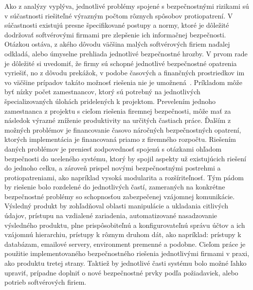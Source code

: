 Ako z analýzy vyplýva, jednotlivé problémy spojené s bezpečnostnými rizikami sú v súčastnosti riešiteľné výrazným počtom
rôznych spôsobov protiopatrení.
V súčastnosti existujú presne špecifikované postupy a normy, ktoré je dôležité dodržovať softvérovými firmami pre zlepšenie
ich informačnej bezpečnosti.
Otázkou ostáva, z akého dôvodu väčšina malých softvérových firiem naďalej odkladá, alebo úmyselne prehliada jednotlivé bezpečnostné hrozby.
V prvom rade je dôležité si uvedomiť, že firmy sú schopné jednotlivé bezpečnostné opatrenia vyriešiť, no z dôvodu
prekážok, v podobe časových a finančných prostriedkov im vo väčšine prípadov takáto možnosť riešenia nie je umožnená~\cite{CompanySecurity}.
Príkladom môže byť nízky počet zamestnancov, ktorý sú potrebný na jednotlivých špecializovaných úlohách pridelených k projektom.
Prevelením jednoho zamestnanca z projektu s cieľom riešenia firemnej bezpečnosti, môže mať za následok výrazné zníženie
produktivity na určitých častiach práce.
Ďalším z možných problémov je financovanie časovo náročných bezpečnostných opatrení, ktorých implementácia je financovaná
priamo z firemného rozpočtu.
Riešením daných problémov je preniesť zodpovednosť spojenú s otázkami ohľadom bezpečnosti do uceleného systému, ktorý by
spojil aspekty už existujúcich riešení do jednoho celku, a zároveň prispel novými bezpečnostnými postrehmi a protiopatreniami,
ako napríklad vysoká modularita a rozšíriteľnosť.
Tým pádom by riešenie bolo rozdelené do jednotlivých častí, zameraných na konkrétne bezpečnostné problémy so schopnosťou
zabezpečenej vzájomnej komunikácie.
Výsledný produkt by zohľadňoval oblasti manipulácie a ukladania citlivých údajov, prístupu na vzdialené zariadenia,
automatizované nasadzovanie výsledného produktu, plne prispôsobiteľnú a konfigurovateľnú správu účtov a ich vzájomnú
hierarchiu, prístupy k rôznym druhom dát, ako napríklad: prístupy k databázam, emailové servery, environment premenné a
podobne.
Cieľom práce je použitie implementovaného bezpečnostného riešenia jednotlivými firmami v praxi, ako produktu tretej strany.
Taktiež by jednotlivé časti systému bolo možné ľahko upraviť, prípadne doplniť o nové bezpečnostné prvky podľa požiadaviek, alebo
potrieb softvérových firiem.
